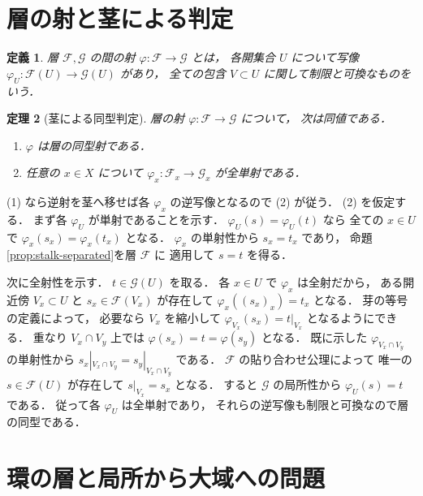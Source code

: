 \documentclass[a5paper,10pt,onecolumn]{jsarticle}
\makeatletter
\theoremstyle{mathnotetheorem}
\newtheorem{theorem}{定理}[section]
\newtheorem{definition}[theorem]{定義}
\renewcommand{\proofname}{証明}
\renewenvironment{proof}[1][\proofname]{%
  \par\pushQED{\qed}\normalfont\topsep4\p@\@plus2\p@\relax
  \trivlist\item[\hskip\labelsep\bfseries #1]\ignorespaces
}{\popQED\endtrivlist\@endpefalse}
\makeatother
\begin{document}
\section{層の射と茎による判定}

\begin{definition}
層 $\mathcal F,\mathcal G$ の間の射
$\varphi:\mathcal F\to\mathcal G$ とは，
各開集合 $U$ について写像
$\varphi_U:\mathcal F(U)\to\mathcal G(U)$ があり，
全ての包含 $V\subset U$ に関して制限と可換なものをいう．
\end{definition}

\begin{theorem}[茎による同型判定]\label{thm:stalk-criterion}
層の射 $\varphi:\mathcal F\to\mathcal G$ について，
次は同値である．
\begin{enumerate}
\item $\varphi$ は層の同型射である．
\item 任意の $x\in X$ について
$\varphi_x:\mathcal F_x\to\mathcal G_x$ が全単射である．
\end{enumerate}
\end{theorem}
\begin{proof}
(1) なら逆射を茎へ移せば各 $\varphi_x$ の逆写像となるので
(2) が従う．
(2) を仮定する．
まず各 $\varphi_U$ が単射であることを示す．
$\varphi_U(s)=\varphi_U(t)$ なら
全ての $x\in U$ で
$\varphi_x(s_x)=\varphi_x(t_x)$ となる．
$\varphi_x$ の単射性から $s_x=t_x$ であり，
命題\ref{prop:stalk-separated}を層 $\mathcal F$ に
適用して $s=t$ を得る．

次に全射性を示す．
$t\in\mathcal G(U)$ を取る．
各 $x\in U$ で $\varphi_x$ は全射だから，
ある開近傍 $V_x\subset U$ と
$s_x\in\mathcal F(V_x)$ が存在して
$\varphi_x((s_x)_x)=t_x$ となる．
芽の等号の定義によって，
必要なら $V_x$ を縮小して
$\varphi_{V_x}(s_x)=t|_{V_x}$ となるようにできる．
重なり $V_x\cap V_y$ 上では
$\varphi(s_x)=t=\varphi(s_y)$ となる．
既に示した $\varphi_{V_x\cap V_y}$ の単射性から
$s_x|_{V_x\cap V_y}=s_y|_{V_x\cap V_y}$ である．
$\mathcal F$ の貼り合わせ公理によって
唯一の $s\in\mathcal F(U)$ が存在して
$s|_{V_x}=s_x$ となる．
すると $\mathcal G$ の局所性から
$\varphi_U(s)=t$ である．
従って各 $\varphi_U$ は全単射であり，
それらの逆写像も制限と可換なので層の同型である．
\end{proof}

\section{環の層と局所から大域への問題}
\end{document}
